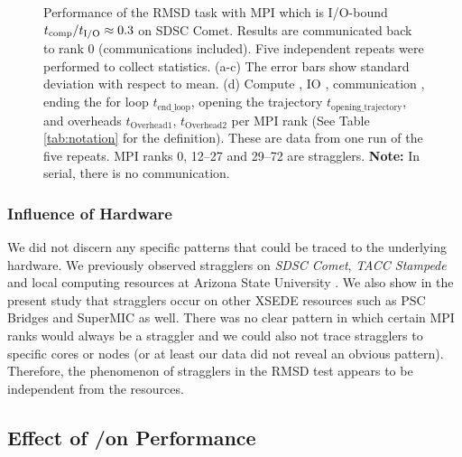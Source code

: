 \begin{figure}
\caption{Performance of the RMSD task with MPI which is I/O-bound ${t}_{\text{comp}}/{t}_{\text{I/O}} \approx 0.3$ on SDSC Comet.
Results are communicated back to rank 0 (communications included). Five independent repeats were performed to collect statistics. (a-c) The error bars show
standard deviation with respect to mean. (d) Compute \tcomp, IO \tIO, communication \tcomm, ending the for loop \texttt{$t_{\text{end\_loop}}$},
  opening the trajectory \texttt{$t_{\text{opening\_trajectory}}$}, and overheads \texttt{$t_{\text{Overhead1}}$},  \texttt{$t_{\text{Overhead2}}$} per MPI rank (See Table \ref{tab:notation} for the definition).
These are data from one run of the five repeats. MPI ranks 0, 12--27 and 29--72 are stragglers. \textbf{Note:} In serial, there is no communication.}
\label{fig:MPIwithIO}
\end{figure} 


\subsubsection*{Influence of Hardware}
We did not discern any specific patterns that could be traced to the underlying hardware. 
We previously observed stragglers on \emph{SDSC Comet}, \emph{TACC Stampede} and local computing resources at Arizona State University \cite{Khoshlessan:2017ab}. 
We also show in the present study that stragglers occur on other XSEDE resources such as PSC Bridges and SuperMIC as well.
There was no clear pattern in which certain MPI ranks would always be a straggler and we could also not trace stragglers to specific cores or nodes (or at least our data did not reveal an obvious pattern). 
Therefore, the phenomenon of stragglers in the RMSD test appears to be independent from the resources.

\subsection{Effect of \tcomp/\tIO on Performance}
\label{bound}

